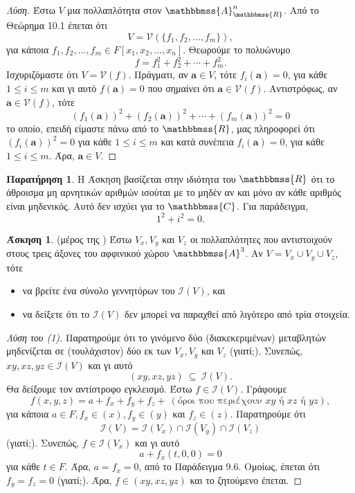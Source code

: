 \documentclass[12pt,a4paper,reqno]{amsart}
\theoremstyle{definition}
\newtheorem{exercise}{Άσκηση}
\newtheorem*{remark}{Παρατήρηση}
\renewcommand{\AA}{\mathbbmss{A}}
\newcommand{\RR}{\mathbbmss{R}}
\newcommand{\CC}{\mathbbmss{C}}
\newcommand{\iI}{\mathcal{I}}
\newcommand{\vV}{\mathcal{V}}
\newcommand{\bfa}{\mathbf{a}}
\begin{document}
\begin{proof}[Λύση]
  Έστω $V$ μια πολλαπλότητα στον $\AA_{\RR}^n$. Από το Θεώρημα 10.1 έπεται ότι 
  \[
  V = \vV\left(
    \{
      f_1, f_2, \dots, f_m
    \}
  \right),
  \]
  για κάποια $f_1, f_2, \dots, f_m \in F[x_1, x_2, \dots, x_n]$. Θεωρούμε το πολυώνυμο 
  \[
  f = f_1^2 + f_2^2 + \cdots + f_m^2.
  \]
  Ισχυριζόμαστε ότι $V = \vV(f)$. Πράγματι, αν $\bfa \in V$, τότε $f_i(\bfa) = 0$, για κάθε $1 \le i \le m$ και γι αυτό $f(\bfa) = 0$ που σημαίνει ότι $\bfa \in \vV(f)$. Αντιστρόφως, αν $\bfa \in \vV(f)$, τότε 
  \[
  \left(f_1(\bfa)\right)^2 + \left(f_2(\bfa)\right)^2 + \cdots + \left(f_m(\bfa)\right)^2 = 0
  \]
  το οποίο, επειδή είμαστε πάνω από το $\RR$, μας πληροφορεί ότι $\left(f_i(\bfa)\right)^2 = 0$ για κάθε $1 \le i \le m$ και κατά συνέπεια $f_i(\bfa) = 0$, για κάθε $1 \le i \le m$. Άρα, $\bfa \in V$.
\end{proof}

\begin{remark}
  H Άσκηση βασίζεται στην ιδιότητα του $\RR$ ότι το άθροισμα μη αρνητικών αριθμών ισούται με το μηδέν αν και μόνο αν κάθε αριθμός είναι μηδενικός. Αυτό δεν ισχύει για το $\CC$. Για παράδειγμα, 
  \[
  1^2 + i^2 = 0.
  \]
\end{remark}

\begin{exercise}{\rm(μέρος της \cite[Άσκηση~8.4]{Mal08})}
  Έστω $V_x, V_y$ και $V_z$ οι πολλαπλότητες που αντιστοιχούν στους τρεις άξονες του αφφινικού χώρου $\AA^3$. Αν $V = V_x \cup V_y \cup V_z$, τότε
  \begin{itemize}
    \item[(1)] να βρείτε ένα σύνολο γεννητόρων του $\iI(V)$, και 
    \item[(2)] να δείξετε ότι το $\iI(V)$ δεν μπορεί να παραχθεί από λιγότερο από τρία στοιχεία.
  \end{itemize}
\end{exercise}

\begin{proof}[Λύση του (1)]
  Παρατηρούμε ότι το γινόμενο δύο (διακεκεριμένων) μεταβλητών μηδενίζεται σε (τουλάχιστον) δύο εκ των $V_x, V_y$ και $V_z$ (γιατί;). Συνεπώς, $xy, xz, yz \in \iI(V)$ και γι αυτό 
  \[
  (xy, xz, yz) \ \subseteq \ \iI(V).
  \]
  Θα δείξουμε τον αντίστροφο εγκλεισμό. Έστω $f \in \iI(V)$. Γράφουμε 
  \[
  f(x,y,z) = a + f_x + f_y + f_z + \ \left(\text{όροι που περιέχουν $xy$ ή $xz$ ή $yz$}\right),
  \] 
  για κάποια $a \in F, f_x \in (x), f_y \in (y)$ και $f_z \in (z)$. Παρατηρούμε ότι  
  \[
  \iI(V) = \iI(V_x) \cap \iI(V_y) \cap \iI(V_z)
  \]
  (γιατί;). Συνεπώς, $f \in \iI(V_x)$ και γι αυτό 
  \[
  a + f_x(t,0,0) = 0
  \]
  για κάθε $t \in F$. Άρα, $a = f_x = 0$, από το Παράδειγμα 9.6.
  Ομοίως, έπεται ότι $f_y = f_z = 0$ (γιατί;). Άρα, $f \in (xy, xz, yz)$ και το ζητούμενο έπεται.
\end{proof}
\end{document}
